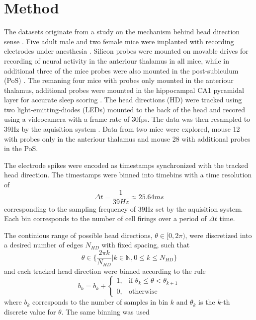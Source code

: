 \section{Method}
The datasets originate from a study on the mechanism behind head direction sense \cite{projectdata}.
Five adult male and two female mice were implanted with recording electrodes under anesthesia \cite{projectdata}.
Silicon probes were mounted on movable drives for recording of neural activity in the anteriour thalamus in all mice, while in additional three of the mice probes were also mounted in the post-subiculum (PoS) \cite{projectdata}. The remaning four mice with probes only mounted in the anteriour thalamus, additional probes were mounted in the hippocampal CA1 pyramidal layer for accurate sleep scoring \cite{projectdata}.
The head directions (HD) were tracked using two light-emitting-diodes (LEDs) mounted to the back of the head and recored using a videocamera with a frame rate of 30fps. The data was then resampled to 39Hz by the aquisition system \cite{projectdata}.
Data from two mice were explored, mouse 12 with probes only in the anteriour thalamus and mouse 28 with additional probes in the PoS.  

The electrode spikes were encoded as timestamps synchronized with the tracked head direction. The timestamps were binned into timebins with a time resolution of 
$$\Delta t = \frac{1}{39Hz} \approx 25.64ms$$ 
corresponding to the sampling frequency of $39$Hz set by the aquisition system. Each bin corresponds to the number of cell firings over a period of $\Delta t$ time.

The continious range of possible head directions, $\theta \in [0, 2\pi)$, were discretized into a desired number of edges $N_{HD}$ with fixed spacing, such that
$$\theta \in \{\frac{2 \pi k}{N_{HD}}| k \in \mathbb{N}, 0 \leq k \leq N_{HD} \}$$
and each tracked head direction were binned according to the rule
\begin{equation}
    b_k = b_k + \begin{cases}
        1, & \text{if } \theta_k \leq \theta < \theta_{k+1} \\
        0, & \text{otherwise}
    \end{cases}
\end{equation}
where $b_k$ corresponds to the number of samples in bin $k$ and $\theta_k$ is the $k$-th discrete value for $\theta$. The same binning was used